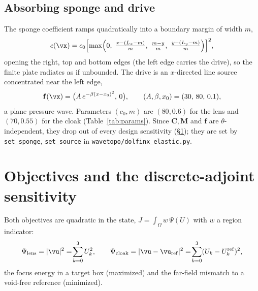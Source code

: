 \documentclass[11pt]{article}
\begin{document}
\subsection{Absorbing sponge and drive}
\label{sec:sponge}
The sponge coefficient ramps quadratically into a boundary margin of width $m$,
\begin{equation}
  c(\vx)=c_0\Bigl[\max\Bigl(0,\ \tfrac{x-(L_x-m)}{m},\ \tfrac{m-y}{m},\
  \tfrac{y-(L_y-m)}{m}\Bigr)\Bigr]^2 ,
  \label{eq:sponge}
\end{equation}
opening the right, top and bottom edges (the left edge carries the drive), so the
finite plate radiates as if unbounded. The drive is an $x$-directed line source
concentrated near the left edge,
\begin{equation}
  \mathbf f(\vx)=\bigl(A\,e^{-\beta (x-x_0)^2},\,0\bigr),\qquad
  (A,\beta,x_0)=(30,\,80,\,0.1),
  \label{eq:source}
\end{equation}
a plane pressure wave. Parameters $(c_0,m)$ are $(80,0.6)$ for the lens and
$(70,0.55)$ for the cloak (Table~\ref{tab:params}). Since $\mathbf C,\mathbf M$
and $\mathbf f$ are $\theta$-independent, they drop out of every design
sensitivity (\S\ref{sec:adj}); they are set by \texttt{set\_sponge},
\texttt{set\_source} in \texttt{wavetopo/dolfinx\_elastic.py}.

\section{Objectives and the discrete-adjoint sensitivity}
\label{sec:adj}
Both objectives are quadratic in the state, $J=\int_\Omega w\,\Psi(U)$ with $w$ a
region indicator:
\begin{equation}
  \Psi_{\rm lens}=|\vu|^2=\!\sum_{k=0}^{3}U_k^2,\qquad
  \Psi_{\rm cloak}=|\vu-\vu_{\rm ref}|^2=\!\sum_{k=0}^{3}(U_k-U_k^{\rm ref})^2,
\end{equation}
the focus energy in a target box (maximized) and the far-field mismatch to a
void-free reference (minimized).
\end{document}
